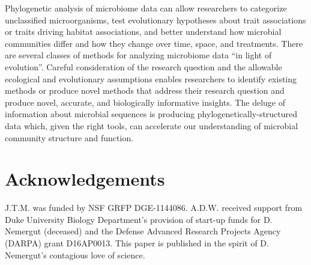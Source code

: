 Phylogenetic analysis of microbiome data can allow researchers to categorize unclassified microorganisms, test evolutionary hypotheses about trait associations or traits driving habitat associations, and better understand how microbial communities differ and how they change over time, space, and treatments. There are several classes of methods for analyzing microbiome data “in light of evolution”. Careful consideration of the research question and the allowable ecological and evolutionary assumptions enables researchers to identify existing methods or produce novel methods that address their research question and produce novel, accurate, and biologically informative insights. The deluge of information about microbial sequences is producing phylogenetically-structured data which, given the right tools, can accelerate our understanding of microbial community structure and function.

\section{Acknowledgements}
J.T.M. was funded by NSF GRFP DGE-1144086. A.D.W. received support from Duke University Biology Department’s provision of start-up funds for D. Nemergut (deceased) and the Defense Advanced Research Projects Agency (DARPA) grant D16AP0013. This paper is published in the spirit of D. Nemergut’s contagious love of science.
